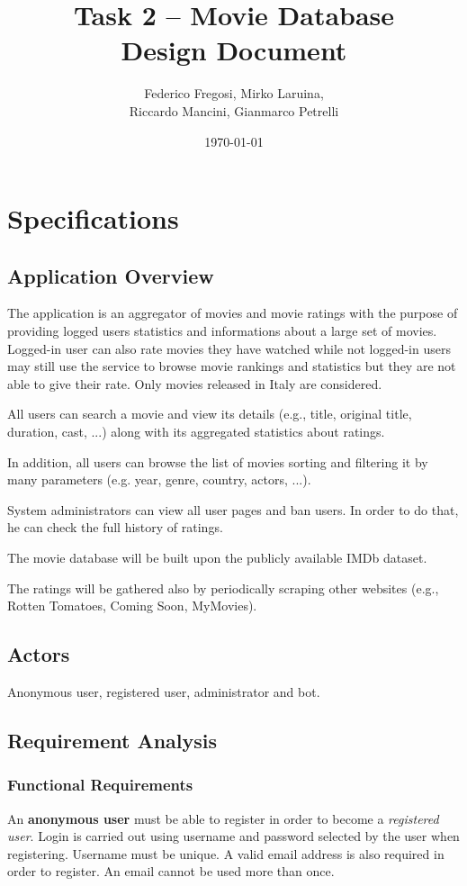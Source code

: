 \documentclass[11pt]{article}
\title{Task 2 -- Movie Database\\ 
	\Large Design Document}
\date{\today}
\author{Federico Fregosi, Mirko Laruina,\\
        Riccardo Mancini, Gianmarco Petrelli}
\begin{document}
\maketitle
\vfill
\tableofcontents
\vfill
\clearpage
\setcounter{page}{1}

\section{Specifications}

\subsection{Application Overview}
The application is an aggregator of movies and movie ratings with the purpose 
of providing logged users statistics and informations about a large set of movies.
Logged-in user can also rate movies they have watched while not logged-in users 
may still use the service to browse movie rankings and statistics but they are not
able to give their rate. Only movies released in Italy are considered.

All users can search a movie and view its details (e.g., title, original title, duration, 
cast, ...) along with its aggregated statistics about ratings. 

In addition, all users can browse the list of movies sorting and filtering it by many parameters
(e.g. year, genre, country, actors, ...).

System administrators can view all user pages and ban users. In order to do that, he can 
check the full history of ratings.

The movie database will be built upon the publicly available IMDb dataset.

The ratings will be gathered also by periodically scraping other websites 
(e.g., Rotten Tomatoes, Coming Soon, MyMovies).

\subsection{Actors}
Anonymous user, registered user, administrator and bot.

\subsection{Requirement Analysis}

\subsubsection{Functional Requirements}
An \textbf{anonymous user} must be able to register in order to become a 
\textit{registered user}. Login is carried out using username and password selected 
by the user when registering. Username must be unique. A valid email address is
also required in order to register. An email cannot be used more than once.
\end{document}
